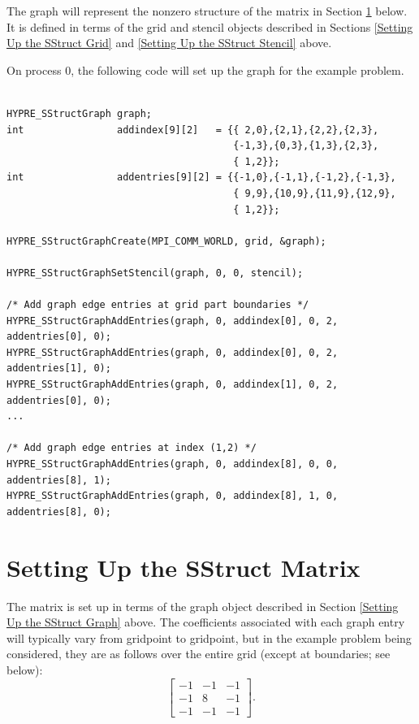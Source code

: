 The graph will represent the nonzero structure of the matrix in
Section \ref{Setting Up the SStruct Matrix} below.  It is defined in
terms of the grid and stencil objects described in Sections
\ref{Setting Up the SStruct Grid} and \ref{Setting Up the SStruct
Stencil} above.

On process 0, the following code will set up the graph for the
example problem.
\begin{display}
\begin{verbatim}

HYPRE_SStructGraph graph;
int                addindex[9][2]   = {{ 2,0},{2,1},{2,2},{2,3},
                                       {-1,3},{0,3},{1,3},{2,3},
                                       { 1,2}};
int                addentries[9][2] = {{-1,0},{-1,1},{-1,2},{-1,3},
                                       { 9,9},{10,9},{11,9},{12,9},
                                       { 1,2}};

HYPRE_SStructGraphCreate(MPI_COMM_WORLD, grid, &graph);

HYPRE_SStructGraphSetStencil(graph, 0, 0, stencil);

/* Add graph edge entries at grid part boundaries */
HYPRE_SStructGraphAddEntries(graph, 0, addindex[0], 0, 2, addentries[0], 0);
HYPRE_SStructGraphAddEntries(graph, 0, addindex[0], 0, 2, addentries[1], 0);
HYPRE_SStructGraphAddEntries(graph, 0, addindex[1], 0, 2, addentries[0], 0);
...

/* Add graph edge entries at index (1,2) */
HYPRE_SStructGraphAddEntries(graph, 0, addindex[8], 0, 0, addentries[8], 1);
HYPRE_SStructGraphAddEntries(graph, 0, addindex[8], 1, 0, addentries[8], 0);

\end{verbatim}
\end{display}


\section{Setting Up the SStruct Matrix}
\label{Setting Up the SStruct Matrix}

The matrix is set up in terms of the graph object described in Section
\ref{Setting Up the SStruct Graph} above.  The coefficients associated
with each graph entry will typically vary from gridpoint to gridpoint,
but in the example problem being considered, they are as follows over
the entire grid (except at boundaries; see below):
\begin{equation}\label{sstruct:eqn-stencil-laplacian}
\left [
\begin{array}{ccc}
 -1 & -1 & -1 \\
 -1 &  8 & -1 \\
 -1 & -1 & -1 
\end{array}
\right ] .
\end{equation}

